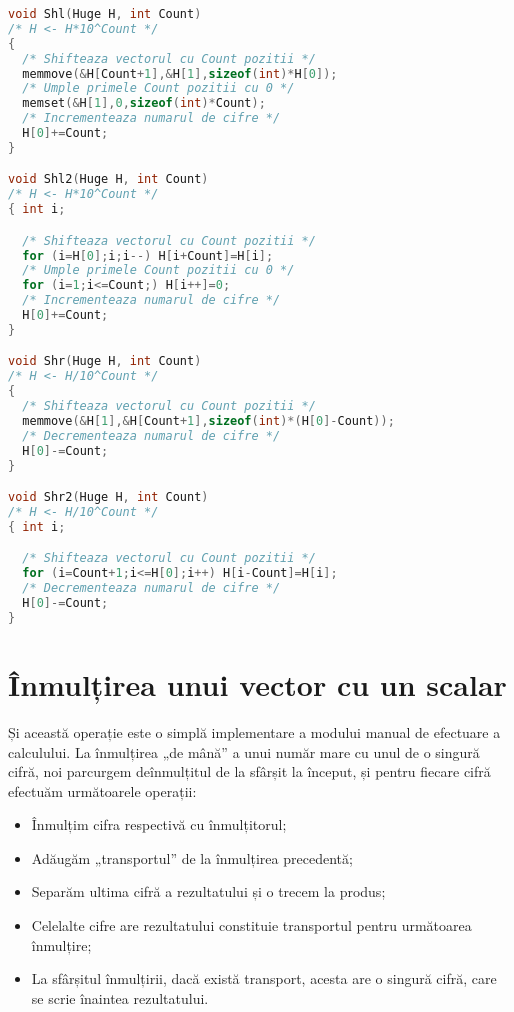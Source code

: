 \begin{lstlisting}[language=C]
void Shl(Huge H, int Count)
/* H <- H*10^Count */
{ 
  /* Shifteaza vectorul cu Count pozitii */
  memmove(&H[Count+1],&H[1],sizeof(int)*H[0]);
  /* Umple primele Count pozitii cu 0 */
  memset(&H[1],0,sizeof(int)*Count);
  /* Incrementeaza numarul de cifre */
  H[0]+=Count;
}

void Shl2(Huge H, int Count)
/* H <- H*10^Count */
{ int i;

  /* Shifteaza vectorul cu Count pozitii */
  for (i=H[0];i;i--) H[i+Count]=H[i];
  /* Umple primele Count pozitii cu 0 */
  for (i=1;i<=Count;) H[i++]=0;
  /* Incrementeaza numarul de cifre */
  H[0]+=Count;
}

void Shr(Huge H, int Count)
/* H <- H/10^Count */
{ 
  /* Shifteaza vectorul cu Count pozitii */
  memmove(&H[1],&H[Count+1],sizeof(int)*(H[0]-Count));
  /* Decrementeaza numarul de cifre */
  H[0]-=Count;
}

void Shr2(Huge H, int Count)
/* H <- H/10^Count */
{ int i;

  /* Shifteaza vectorul cu Count pozitii */
  for (i=Count+1;i<=H[0];i++) H[i-Count]=H[i];
  /* Decrementeaza numarul de cifre */
  H[0]-=Count;
}
\end{lstlisting}

\section{Înmulțirea unui vector cu un scalar}

Și această operație este o simplă implementare a modului manual de efectuare a
calculului. La înmulțirea „de mână” a unui număr mare cu unul de o singură
cifră, noi parcurgem deînmulțitul de la sfârșit la început, și pentru fiecare
cifră efectuăm următoarele operații:

\begin{itemize}

\item Înmulțim cifra respectivă cu înmulțitorul;

\item Adăugăm „transportul” de la înmulțirea precedentă;

\item Separăm ultima cifră a rezultatului și o trecem la produs;

\item Celelalte cifre are rezultatului constituie transportul pentru
  următoarea înmulțire;

\item La sfârșitul înmulțirii, dacă există transport, acesta are o singură
  cifră, care se scrie înaintea rezultatului.

\end{itemize}

